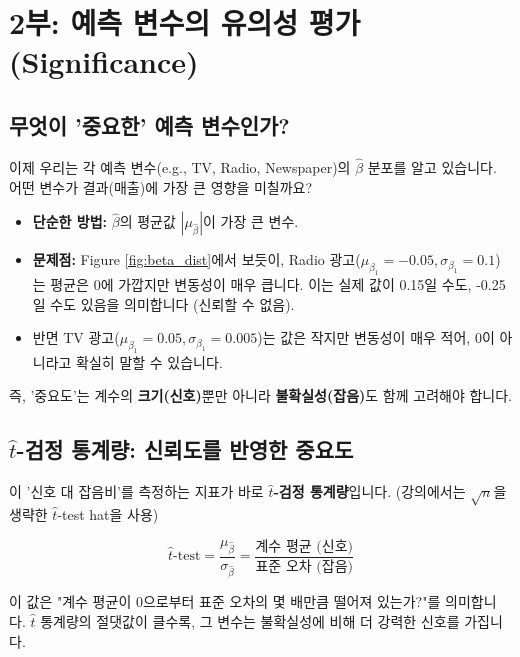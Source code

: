 \documentclass[11pt,a4paper]{book}
\theoremstyle{definition}
\begin{document}
\section{2부: 예측 변수의 유의성 평가 (Significance)}

\subsection{무엇이 '중요한' 예측 변수인가?}

이제 우리는 각 예측 변수(e.g., TV, Radio, Newspaper)의 $\hat{\beta}$ 분포를 알고 있습니다. 어떤 변수가 결과(매출)에 가장 큰 영향을 미칠까요?

\begin{itemize}
    \item \textbf{단순한 방법:} $\hat{\beta}$의 평균값 $|\mu_{\hat{\beta}}|$이 가장 큰 변수.
    \item \textbf{문제점:} Figure \ref{fig:beta_dist}에서 보듯이, Radio 광고($\mu_{\beta_1} = -0.05, \sigma_{\beta_1} = 0.1$)는 평균은 0에 가깝지만 변동성이 매우 큽니다. 이는 실제 값이 0.15일 수도, -0.25일 수도 있음을 의미합니다 (신뢰할 수 없음).
    \item 반면 TV 광고($\mu_{\beta_1} = 0.05, \sigma_{\beta_1} = 0.005$)는 값은 작지만 변동성이 매우 적어, 0이 아니라고 확실히 말할 수 있습니다.
\end{itemize}

즉, '중요도'는 계수의 \textbf{크기(신호)}뿐만 아니라 \textbf{불확실성(잡음)}도 함께 고려해야 합니다.

\subsection{$\hat{t}$-검정 통계량: 신뢰도를 반영한 중요도}

이 '신호 대 잡음비'를 측정하는 지표가 바로 \textbf{$\hat{t}$-검정 통계량}입니다. (강의에서는 $\sqrt{n}$을 생략한 $\hat{t}$-test hat을 사용)

\[
    \hat{t}\text{-test} = \frac{\mu_{\hat{\beta}}}{\sigma_{\hat{\beta}}} = \frac{\text{계수 평균 (신호)}}{\text{표준 오차 (잡음)}}
\]

이 값은 "계수 평균이 0으로부터 표준 오차의 몇 배만큼 떨어져 있는가?"를 의미합니다. $\hat{t}$ 통계량의 절댓값이 클수록, 그 변수는 불확실성에 비해 더 강력한 신호를 가집니다.
\end{document}
